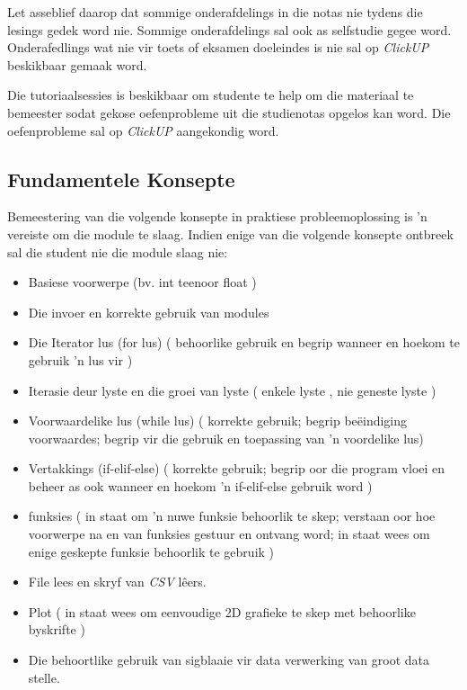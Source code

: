 	Let asseblief daarop dat sommige onderafdelings in die notas nie tydens die lesings
	gedek word nie. Sommige onderafdelings sal ook as selfstudie gegee word.
 	Onderafedlings wat nie vir toets of eksamen doeleindes is nie sal op \textit{ClickUP} beskikbaar 
	gemaak word.

	Die tutoriaalsessies is beskikbaar om studente te help om die materiaal te bemeester sodat 
	gekose oefenprobleme uit die studienotas opgelos kan word. Die oefenprobleme sal op 	   
     	\textit{ClickUP} aangekondig word.	
        
	\subsection{Fundamentele Konsepte}
	Bemeestering van die volgende konsepte in praktiese probleemoplossing is 'n vereiste om die
  	module te slaag. Indien enige
	van die volgende konsepte ontbreek sal die student nie die module slaag nie:

        \begin{itemize}
	\item Basiese voorwerpe (bv. int teenoor float )
            \item Die invoer en korrekte gebruik van modules
            \item Die Iterator lus (for  lus) ( behoorlike gebruik en begrip wanneer en hoekom te gebruik
                'n lus vir )
            \item Iterasie deur lyste en die groei van lyste ( enkele lyste , nie
                geneste lyste )
            \item Voorwaardelike lus (while lus) ( korrekte gebruik; begrip be\"eindiging
                voorwaardes; begrip vir die gebruik en toepassing van 'n voordelike lus)
            \item Vertakkings (if-elif-else) ( korrekte gebruik; begrip oor die program vloei en
                beheer as ook wanneer en hoekom 'n if-elif-else gebruik word )
            \item funksies ( in staat om 'n nuwe funksie behoorlik te skep; verstaan oor
                hoe voorwerpe na en van funksies gestuur en ontvang word; in staat wees om enige
                geskepte funksie behoorlik te gebruik ) 
            \item File lees en skryf van \emph{CSV } lêers.
            \item Plot ( in staat wees om eenvoudige 2D grafieke te skep met behoorlike
                byskrifte )
            \item Die behoortlike gebruik van sigblaaie vir data verwerking van groot data stelle.
        \end{itemize}
    
